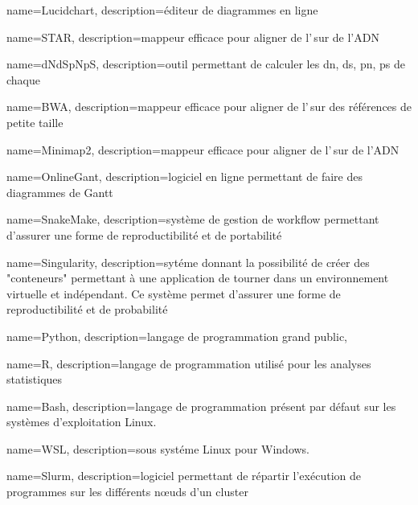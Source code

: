  {
    name=Lucidchart,
    description={éditeur de diagrammes en ligne \cite{lucidchart}}
}

 {
    name=STAR,
    description={\gls{mappeur} efficace pour aligner de l'\ARN\,sur de l'ADN \cite{star}}
}

 {
    name=dNdSpNpS,
    description={outil permettant de calculer les \acrshort{dn}, \acrshort{ds}, \acrshort{pn}, \acrshort{ps} de chaque \contig\,\cite{dNdSpNpS}}
}

 {
    name=BWA,
    description={\gls{mappeur} efficace pour aligner de l'\ARN\,sur des références de petite taille \cite{bwa}}
}
\newcommand{\BWA}{\gls{BWA}}

 {
    name=Minimap2,
    description={\gls{mappeur} efficace pour aligner de l'\ARN\,sur de l'ADN \cite{minimap2}}
}

 {
    name=OnlineGant,
    description={logiciel en ligne permettant de faire des diagrammes de Gantt \cite{gantt}}
}

 {
    name=SnakeMake,
    description={système de gestion de workflow permettant d'assurer une forme de reproductibilité et de portabilité \cite{snakemake} }
}
\newcommand{\SnakeMake}{\gls{SnakeMake}}


 {
    name=Singularity,
    description={sytéme donnant la possibilité de créer des "conteneurs" permettant à une application de tourner dans un environnement virtuelle et indépendant. Ce système permet d'assurer une forme de reproductibilité et de probabilité}
}
\newcommand{\Singularity}{\gls{Singularity}}

 {
    name=Python,
    description={langage de programmation grand public, \cite{python}}
}
\newcommand{\Python}{\gls{Python}}

 {
    name=R,
    description={langage de programmation utilisé pour les analyses statistiques \cite{r}}
}

 {
    name=Bash,
    description={langage de programmation présent par défaut sur les systèmes d'exploitation Linux. \cite{bash}}
}


 {
    name=WSL,
    description={sous systéme Linux pour Windows. \cite{wsl}}
}

 {
    name=Slurm,
    description={logiciel permettant de répartir l'exécution de programmes sur les différents nœuds d'un \gls{cluster} \cite{slurm}}
}
\newcommand{\Slurm}{\gls{Slurm}}

